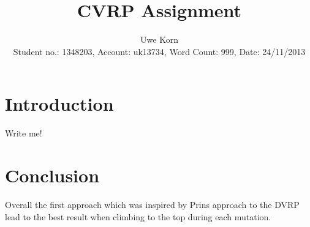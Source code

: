 \documentclass[12pt,journal]{IEEEtran}
\begin{document}
\title{CVRP Assignment}
\author{Uwe Korn \\
Student no.: 1348203, Account: uk13734, Word Count: 999, Date: 24/11/2013}
\maketitle

\IEEEpeerreviewmaketitle

\newcommand{\todo}[1]{{\color{red} #1}}

\section{Introduction}
\todo{Write me!}
\section{Conclusion}
Overall the first approach which was inspired by Prins \cite{prins2004simple} approach to the DVRP lead to the best result when climbing to the top during each mutation.



\end{document}
